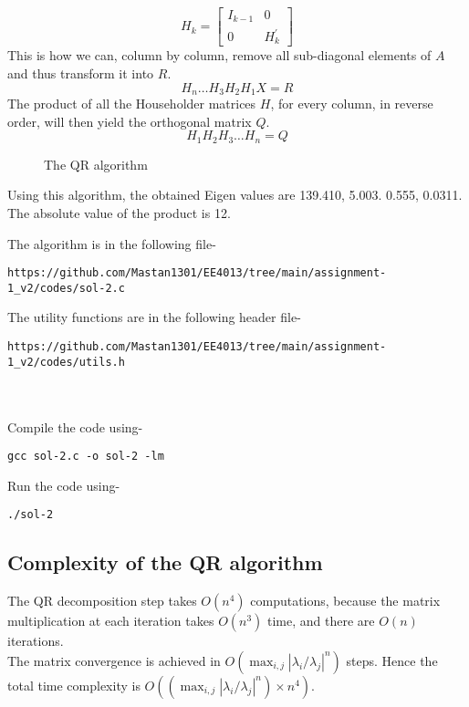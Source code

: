 \documentclass[journal,12pt,twocolumn]{IEEEtran}
\begin{document}
    $$
    H_{k}=\left[\begin{array}{cc}
    I_{k-1} & 0 \\
    0 & H_{k}^{\prime}
    \end{array}\right]
    $$
    This is how we can, column by column, remove all sub-diagonal elements of $A$ and thus transform it into $R$.
$$H_{n} \ldots H_{3} H_{2} H_{1} X=R$$
The product of all the Householder matrices $H$, for every column, in reverse order, will then yield the orthogonal matrix $Q$.
$$
H_{1} H_{2} H_{3} \ldots H_{n}=Q
$$

\begin{figure}[h!]
	\begin{center}
		\resizebox{\columnwidth/1}{!}{}
	\end{center}
	\caption{The QR algorithm}
	\label{fig:fig4}
\end{figure}

Using this algorithm, the obtained Eigen values are 139.410, 5.003. 0.555, 0.0311. The absolute value of the product is 12. 

The algorithm is in the following file- 
\begin{lstlisting}
https://github.com/Mastan1301/EE4013/tree/main/assignment-1_v2/codes/sol-2.c
\end{lstlisting}
The utility functions are in the following header file- 
\begin{lstlisting}
https://github.com/Mastan1301/EE4013/tree/main/assignment-1_v2/codes/utils.h
\end{lstlisting}
\\ ~ \\
Compile the code using-
\begin{lstlisting}
gcc sol-2.c -o sol-2 -lm
\end{lstlisting}
Run the code using-
\begin{lstlisting}
./sol-2
\end{lstlisting}

\subsection{Complexity of the QR algorithm}
The QR decomposition step takes $O(n ^ 4)$ computations, because the matrix multiplication at each iteration takes $O(n^3)$ time, and there are $O(n)$ iterations. \\
    The matrix convergence is achieved in $O(\max_{i, j} |\lambda_i / \lambda_j| ^ n)$ steps. Hence the total time complexity is $O((\max_{i, j} |\lambda_i / \lambda_j| ^ n) \times n ^ 4)$.
\end{document}
